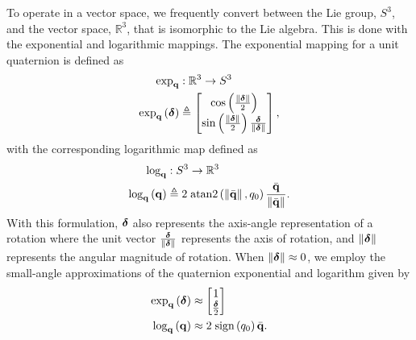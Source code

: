 To operate in a vector space, we frequently convert between the Lie group,
$S^3$,
and the vector space, $\mathbb{R}^3$, that is isomorphic to the Lie algebra.
This is done with the
exponential and logarithmic mappings. The exponential mapping for a unit quaternion is defined as
\begin{align}
\exp_{\boldsymbol{\mathrm{q}}} & :\mathbb{R}^{3}\rightarrow S^3\nonumber \\
\exp_{\boldsymbol{\mathrm{q}}}\left(\boldsymbol{\mathrm{\delta}}\right) & \triangleq\begin{bmatrix}\cos\left(\frac{\lVert\boldsymbol{\mathrm{\delta}}\rVert}{2}\right)\\
\sin\left(\frac{\lVert\boldsymbol{\mathrm{\delta}}\rVert}{2}\right)\frac{\boldsymbol{\mathrm{\delta}}}{\lVert\boldsymbol{\mathrm{\delta}}\rVert}
\end{bmatrix},\label{eqn:exponential_map}
\end{align}
with the corresponding logarithmic map defined as
\begin{align}
\log_{\boldsymbol{\mathrm{q}}} & :S^3\rightarrow \mathbb{R}^{3}\nonumber \\
\log_{\boldsymbol{\mathrm{q}}}\left(\boldsymbol{\mathrm{q}}\right) & \triangleq2\;\mathrm{atan2}\left(\left\Vert \bar{\boldsymbol{\mathrm{q}}}\right\Vert ,q_{0}\right)\frac{\bar{\boldsymbol{\mathrm{q}}}}{\left\Vert \bar{\boldsymbol{\mathrm{q}}}\right\Vert }.\label{eqn:log_map}
\end{align}
With this formulation, $\boldsymbol{\mathrm{\delta}}$ also represents the axis-angle
representation of a rotation where the unit vector
$\frac{\boldsymbol{\mathrm{\delta}}}{\left\Vert \boldsymbol{\mathrm{\delta}}\right\Vert}$ represents the axis of rotation,
and $\left\Vert \boldsymbol{\mathrm{\delta}}\right\Vert$ represents the angular magnitude of rotation.
When $\left\Vert \boldsymbol{\mathrm{\delta}}\right\Vert\approx0$,
we employ the small-angle approximations of the quaternion exponential and
logarithm given by
\begin{align}
\exp_{\boldsymbol{\mathrm{q}}}\left(\boldsymbol{\mathrm{\delta}}\right) & \approx\begin{bmatrix}1\\
\frac{\boldsymbol{\mathrm{\delta}}}{2}
\end{bmatrix}\label{eq:est_paper_quaternion_exp_approx}\\
\log_{\boldsymbol{\mathrm{q}}}\left(\boldsymbol{\mathrm{q}}\right) & \approx2\;\textrm{sign}\left(q_{0}\right)\bar{\boldsymbol{\mathrm{q}}}.\label{eq:quaternion_log_approx}
\end{align}


